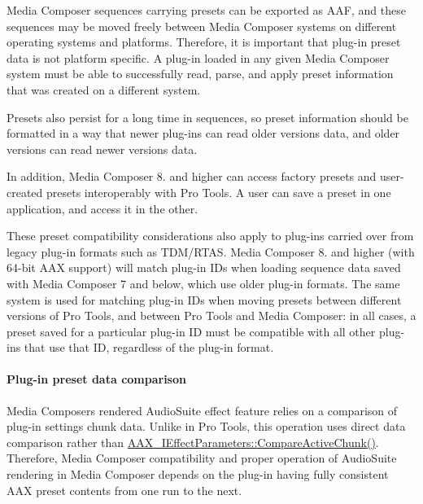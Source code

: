 Media Composer sequences carrying presets can be exported as A\+A\+F, and these sequences may be moved freely between Media Composer systems on different operating systems and platforms. Therefore, it is important that plug-\/in preset data is not platform specific. A plug-\/in loaded in any given Media Composer system must be able to successfully read, parse, and apply preset information that was created on a different system.

Presets also persist for a long time in sequences, so preset information should be formatted in a way that newer plug-\/ins can read older version\textquotesingle{}s data, and older versions can read newer version\textquotesingle{}s data.

In addition, Media Composer 8. and higher can access factory presets and user-\/created presets interoperably with Pro Tools. A user can save a preset in one application, and access it in the other.

These preset compatibility considerations also apply to plug-\/ins carried over from legacy plug-\/in formats such as T\+D\+M/\+R\+T\+A\+S. Media Composer 8. and higher (with 64-\/bit A\+A\+X support) will match plug-\/in I\+Ds when loading sequence data saved with Media Composer 7 and below, which use older plug-\/in formats. The same system is used for matching plug-\/in I\+Ds when moving presets between different versions of Pro Tools, and between Pro Tools and Media Composer\+: in all cases, a preset saved for a particular plug-\/in I\+D must be compatible with all other plug-\/ins that use that I\+D, regardless of the plug-\/in format.

\hypertarget{a00361_subsubsection__aax_media_composer_guide__features__presets__comparison}{}\paragraph{Plug-\/in preset data comparison}\label{a00361_subsubsection__aax_media_composer_guide__features__presets__comparison}
 Media Composer\textquotesingle{}s rendered Audio\+Suite effect feature relies on a comparison of plug-\/in settings chunk data. Unlike in Pro Tools, this operation uses direct data comparison rather than \hyperlink{a00061_a1e86f849e970c9998313fc7d451ccf85}{A\+A\+X\+\_\+\+I\+Effect\+Parameters\+::\+Compare\+Active\+Chunk()}. Therefore, Media Composer compatibility and proper operation of Audio\+Suite rendering in Media Composer depends on the plug-\/in having fully consistent A\+A\+X preset contents from one run to the next.

